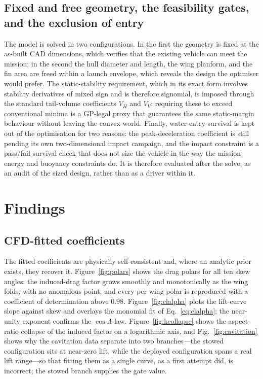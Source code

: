\documentclass[conf]{new-aiaa}
\begin{document}
\subsection{Fixed and free geometry, the feasibility gates, and the exclusion of entry}
The model is solved in two configurations. In the first the geometry is fixed at the as-built CAD
dimensions, which verifies that the existing vehicle can meet the mission; in the second the hull
diameter and length, the wing planform, and the fin area are freed within a launch envelope, which
reveals the design the optimiser would prefer. The static-stability requirement, which in its exact
form involves stability derivatives of mixed sign and is therefore signomial, is imposed through the
standard tail-volume coefficients $V_H$ and $V_V$; requiring these to exceed conventional minima is a
GP-legal proxy that guarantees the same static-margin behaviour without leaving the convex world.
Finally, water-entry survival is kept out of the optimisation for two reasons: the peak-deceleration
coefficient is still pending its own two-dimensional impact campaign, and the impact constraint is a
pass/fail survival check that does not size the vehicle in the way the mission-energy and buoyancy
constraints do. It is therefore evaluated after the solve, as an audit of the sized design, rather
than as a driver within it.

\section{Findings}\label{sec:findings}

\subsection{CFD-fitted coefficients}
The fitted coefficients are physically self-consistent and, where an analytic prior exists, they
recover it. Figure~\ref{fig:polars} shows the drag polars for all ten skew angles: the induced-drag
factor grows smoothly and monotonically as the wing folds, with no anomalous point, and every
per-wing polar is reproduced with a coefficient of determination above $0.98$.
Figure~\ref{fig:clalpha} plots the lift-curve slope against skew and overlays the monomial fit of
Eq.~\eqref{eq:clalpha}; the near-unity exponent confirms the $\cos\Lambda$ law.
Figure~\ref{fig:kcollapse} shows the aspect-ratio collapse of the induced factor on a logarithmic
axis, and Fig.~\ref{fig:cavitation} shows why the cavitation data separate into two branches---the
stowed configuration sits at near-zero lift, while the deployed configuration spans a real lift
range---so that fitting them as a single curve, as a first attempt did, is incorrect; the stowed
branch supplies the gate value.
\end{document}
